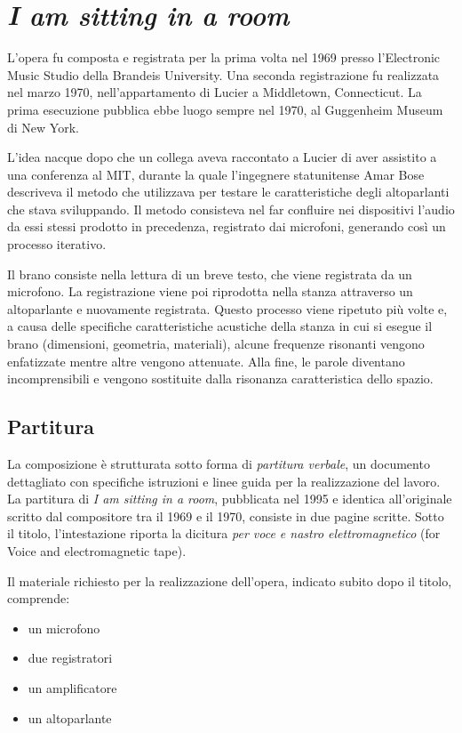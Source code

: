 
\section{\textit{I am sitting in a room}}
L'opera fu composta e registrata per la prima volta nel 1969 presso l'Electronic Music Studio della Brandeis University. Una seconda registrazione fu realizzata nel marzo 1970, nell'appartamento di Lucier a Middletown, Connecticut. La prima esecuzione pubblica ebbe luogo sempre nel 1970, al Guggenheim Museum di New York.

L'idea nacque dopo che un collega aveva raccontato a Lucier di aver assistito a una conferenza al MIT, durante la quale l'ingegnere statunitense Amar Bose descriveva il metodo che utilizzava per testare le caratteristiche degli altoparlanti che stava sviluppando. Il metodo consisteva nel far confluire nei dispositivi l'audio da essi stessi prodotto in precedenza, registrato dai microfoni, generando così un processo iterativo.

Il brano consiste nella lettura di un breve testo, che viene registrata da un microfono. La registrazione viene poi riprodotta nella stanza attraverso un altoparlante e nuovamente registrata. Questo processo viene ripetuto più volte e, a causa delle specifiche caratteristiche acustiche della stanza in cui si esegue il brano (dimensioni, geometria, materiali), alcune frequenze risonanti vengono enfatizzate mentre altre vengono attenuate. Alla fine, le parole diventano incomprensibili e vengono sostituite dalla risonanza caratteristica dello spazio.
\subsection{Partitura}
La composizione è strutturata sotto forma di \textit{partitura verbale}, un documento dettagliato con specifiche istruzioni e linee guida per la realizzazione del lavoro. La partitura di \textit{I am sitting in a room}, pubblicata nel 1995 e identica all'originale scritto dal compositore tra il 1969 e il 1970, consiste in due pagine scritte. Sotto il titolo, l'intestazione riporta la dicitura \textit{per voce e nastro elettromagnetico} (for Voice and electromagnetic tape).

Il materiale richiesto per la realizzazione dell'opera, indicato subito dopo il titolo, comprende:

\begin{itemize}
    \item un microfono
    \item due registratori
    \item un amplificatore
    \item un altoparlante
\end{itemize}

